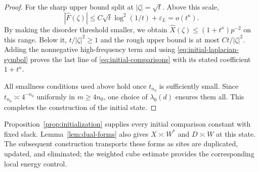 \begin{proof}
For the sharp upper bound split at $|\zeta|=\sqrt t$.  Above this
scale,
\[
 |\widehat F(\zeta)|
 \le C\sqrt t\log^2(1/t)+\varepsilon_L=o(t^\kappa).
\]
By making the disorder threshold smaller, we obtain
$\widehat X(\zeta)\le(1+t^\kappa)p^{-2}$ on this range.
Below it, $t/|\zeta|^2\ge1$ and the rough upper bound is at most
$Ct/|\zeta|^2$.  Adding the nonnegative high-frequency term and using
\eqref{eq:initial-laplacian-symbol} proves the last line of
\eqref{eq:initial-comparisons} with its stated coefficient
$1+t^\kappa$.

All smallness conditions used above hold once $t_{n_0}$ is sufficiently
small.  Since $t_{n_0}\asymp4^{-n_0}$ uniformly in $m\ge4n_0$, one
choice of $\lambda_0(d)$ ensures them all. This completes the construction
of the initial state.
\end{proof}

Proposition~\ref{prop:initialization} supplies every initial comparison constant with fixed
slack.  Lemma~\ref{lem:dual-forms} also gives $X\asymp W^*$ and
$D\asymp W$ at this state.  The subsequent construction transports
these forms as sites are duplicated, updated, and eliminated; the
weighted cube estimate provides the corresponding local energy control.
